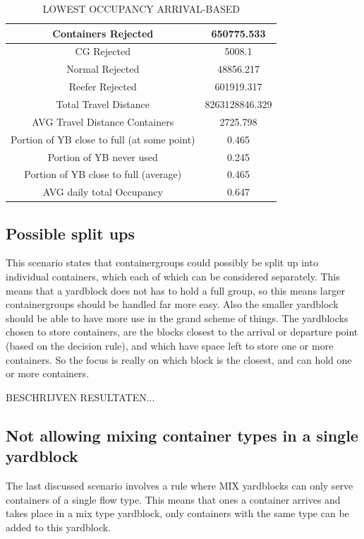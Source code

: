 \documentclass{article}
\begin{document}
\begin{table}[h]
    \centering
    \begin{tabular}{|c|c|}
        \hline
        Containers Rejected                         & 650775.533     \\ \hline
        CG Rejected                                 & 5008.1         \\ \hline
        Normal Rejected                             & 48856.217      \\ \hline
        Reefer Rejected                             & 601919.317     \\ \hline
        Total Travel Distance                       & 8263128846.329 \\ \hline
        AVG Travel Distance Containers              & 2725.798       \\ \hline
        Portion of YB close to full (at some point) & 0.465          \\ \hline
        Portion of YB never used                    & 0.245          \\ \hline
        Portion of YB close to full (average)       & 0.465          \\ \hline
        AVG daily total Occupancy                   & 0.647          \\ \hline
    \end{tabular}
    \caption{LOWEST OCCUPANCY ARRIVAL-BASED}
\end{table}

\subsection{Possible split ups}
This scenario states that containergroups could possibly be split up into
individual containers, which each of which can be considered separately. This
means that a yardblock does not has to hold a full group, so this means larger
containergroups should be handled far more easy. Also the smaller yardblock
should be able to have more use in the grand scheme of things. The yardblocks
chosen to store containers, are the blocks closest to the arrival or departure
point (based on the decision rule), and which have space left to store one or
more containers. So the focus is really on which block is the closest, and can
hold one or more containers.

BESCHRIJVEN RESULTATEN...

\subsection{Not allowing mixing container types in a single yardblock}
The last discussed scenario involves a rule where MIX yardblocks can only serve
containers of a single flow type. This means that ones a container arrives and
takes place in a mix type yardblock, only containers with the same type can be
added to this yardblock.
\end{document}
